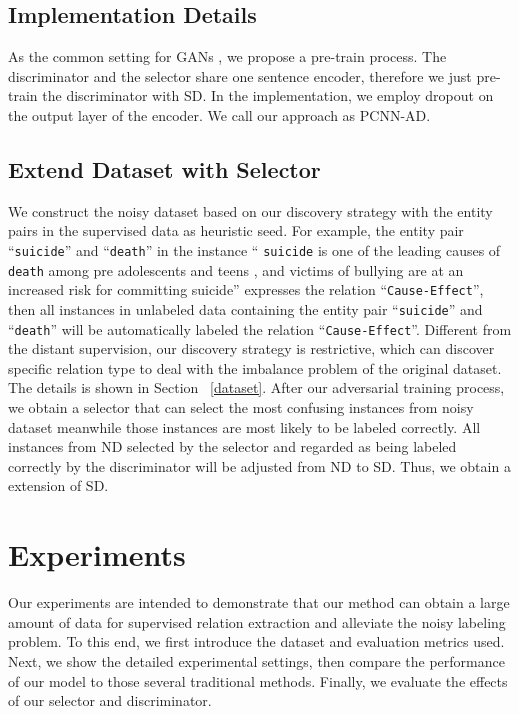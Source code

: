 \documentclass[conference]{IEEEtran}
\begin{document}
\subsection{Implementation Details}
As the common setting for GANs \cite{qin2018dsgan, Wang2019AdversarialTF}, we propose a pre-train process.
The discriminator and the selector share one sentence encoder, therefore we just pre-train the discriminator with SD.
In the implementation, we employ dropout \cite{JMLR:v15:srivastava14a} on the output layer of the encoder.
We call our approach as PCNN-AD. 

\subsection{Extend Dataset with Selector}
\label{sect:extend}
We construct the noisy dataset based on our discovery strategy with the entity pairs in the supervised data as heuristic seed.
For example, the entity pair ``\texttt{suicide}'' and ``\texttt{death}'' in the instance `` \texttt{suicide} is one of the leading causes of \texttt{death} among pre adolescents and teens ,  and victims of bullying are at an increased risk for committing suicide'' expresses the relation ``\texttt{Cause-Effect}'', then all instances in unlabeled data containing the entity pair ``\texttt{suicide}'' and ``\texttt{death}'' will be automatically labeled the relation ``\texttt{Cause-Effect}''.
Different from the distant supervision, our discovery strategy is restrictive, which can discover specific relation type to deal with the imbalance problem of the original dataset.
The details is shown in Section ~\ref{dataset}.
After our adversarial training process, we obtain a selector that can select the most confusing instances from noisy dataset meanwhile those instances are most likely to be labeled correctly. 
All instances from ND selected by the selector and regarded as being labeled correctly by the discriminator will be adjusted from ND to SD.
Thus, we obtain a extension of SD.

\section{Experiments}
Our experiments are intended to demonstrate that our method can obtain a large amount of data for supervised relation extraction and alleviate the noisy labeling problem.
To this end, we first introduce the dataset and evaluation metrics used.
Next, we show the detailed experimental settings, then compare the performance of our model to those several traditional methods.
Finally, we evaluate the effects of our selector and discriminator.
\end{document}
